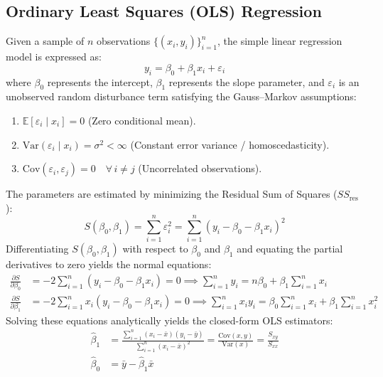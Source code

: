 \documentclass[12pt,a4paper]{article}
\begin{document}
\subsection{Ordinary Least Squares (OLS) Regression}
Given a sample of $n$ observations $\{(x_i, y_i)\}_{i=1}^n$, the simple linear regression model is expressed as:
\begin{equation}
    y_i = \beta_0 + \beta_1 x_i + \varepsilon_i
\end{equation}
where $\beta_0$ represents the intercept, $\beta_1$ represents the slope parameter, and $\varepsilon_i$ is an unobserved random disturbance term satisfying the Gauss--Markov assumptions:
\begin{enumerate}
    \item $\mathbb{E}[\varepsilon_i \mid x_i] = 0$ (Zero conditional mean).
    \item $\text{Var}(\varepsilon_i \mid x_i) = \sigma^2 < \infty$ (Constant error variance / homoscedasticity).
    \item $\text{Cov}(\varepsilon_i, \varepsilon_j) = 0 \quad \forall\, i \neq j$ (Uncorrelated observations).
\end{enumerate}

The parameters are estimated by minimizing the Residual Sum of Squares ($SS_{\text{res}}$):
\begin{equation}
    S(\beta_0, \beta_1) = \sum_{i=1}^n \varepsilon_i^2 = \sum_{i=1}^n \left(y_i - \beta_0 - \beta_1 x_i\right)^2
\end{equation}
Differentiating $S(\beta_0, \beta_1)$ with respect to $\beta_0$ and $\beta_1$ and equating the partial derivatives to zero yields the normal equations:
\begin{align}
    \frac{\partial S}{\partial \beta_0} &= -2 \sum_{i=1}^n (y_i - \beta_0 - \beta_1 x_i) = 0 \implies \sum_{i=1}^n y_i = n \beta_0 + \beta_1 \sum_{i=1}^n x_i \\
    \frac{\partial S}{\partial \beta_1} &= -2 \sum_{i=1}^n x_i (y_i - \beta_0 - \beta_1 x_i) = 0 \implies \sum_{i=1}^n x_i y_i = \beta_0 \sum_{i=1}^n x_i + \beta_1 \sum_{i=1}^n x_i^2
\end{align}
Solving these equations analytically yields the closed-form OLS estimators:
\begin{align}
    \hat{\beta}_1 &= \frac{\sum_{i=1}^n (x_i - \bar{x})(y_i - \bar{y})}{\sum_{i=1}^n (x_i - \bar{x})^2} = \frac{\text{Cov}(x, y)}{\text{Var}(x)} = \frac{S_{xy}}{S_{xx}} \\
    \hat{\beta}_0 &= \bar{y} - \hat{\beta}_1 \bar{x}
\end{align}
\end{document}
